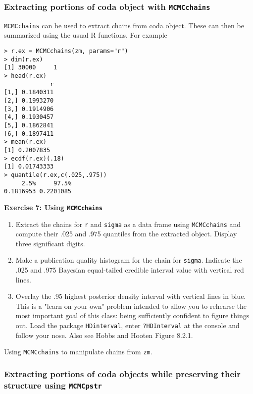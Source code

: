 \documentclass[12pt,english]{article}
\begin{document}
\subsubsection{Extracting portions of coda object with \texttt{MCMCchains}}

\texttt{MCMCchains} can be used to extract chains from coda object.  These can then be summarized using the usual R functions. For example

\begin{Verbatim}
> r.ex = MCMCchains(zm, params="r")
> dim(r.ex)
[1] 30000     1
> head(r.ex)
             r
[1,] 0.1840311
[2,] 0.1993270
[3,] 0.1914906
[4,] 0.1930457
[5,] 0.1862841
[6,] 0.1897411
> mean(r.ex)
[1] 0.2007835
> ecdf(r.ex)(.18)
[1] 0.01743333
> quantile(r.ex,c(.025,.975))
     2.5%     97.5% 
0.1816953 0.2201085
 \end{Verbatim}

\bigskip
\belowcaptionskip=-20pt
\begin{exercise}
\begin{mdframed}
\doublespacing
\textbf{Exercise 7: Using \texttt{MCMCchains}} 
\begin{enumerate}
\item Extract the chains for \texttt{r} and \texttt{sigma} as a data frame using \texttt{MCMCchains} and compute their .025 and .975 quantiles from the extracted object.  Display three significant digits.
\item Make a publication quality histogram for the chain for \texttt{sigma}. Indicate the .025 and .975 Bayesian equal-tailed credible interval value with  vertical red lines.
\item Overlay the .95 highest posterior density interval with vertical lines in blue. This is a "learn on your own" problem intended to allow you to rehearse the most important goal of this class: being sufficiently confident to figure things out.  Load the package \texttt{HDinterval}, enter \texttt{?HDInterval} at the console and follow your nose. Also see Hobbs and Hooten Figure 8.2.1.  
\end{enumerate}
\end{mdframed}
\captionsetup{textformat=empty, labelformat=empty}
\caption[Using \texttt{MCMCchains} to manipulate chains from \texttt{zm}]{Using \texttt{MCMCchains} to manipulate chains from \texttt{zm}.}
\label{ex:MCMCchains}
\end{exercise}
\belowcaptionskip=0pt

\subsubsection{Extracting portions of coda objects while preserving their structure using  \texttt{MCMCpstr}}
\end{document}

